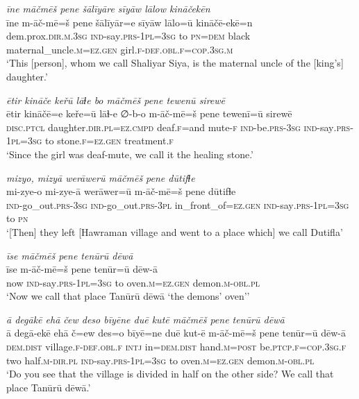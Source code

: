 \ea \label{ZP.36}
\textit{īne māčmēš pene šālīyāre sīyāw lālow kināčekēn} \\ 
\gll īne m-āč-mē=š pene šālīyār=e sīyāw lālo=ū kināčē-ekē=n \\ 
 dem.prox\textsc{.dir}\textsc{.m}\textsc{.3sg} \textsc{ind-}say\textsc{.prs}\textsc{-1pl}\textsc{=3sg} to \textsc{pn}\textsc{=dem} black maternal\_uncle\textsc{.m}\textsc{\textsc{=ez.gen}} girl\textsc{.f}\textsc{-def}\textsc{.obl}\textsc{.f}\textsc{=cop}\textsc{.3sg}\textsc{.m} \\ 
\glt `This [person], whom we call Shaliyar Siya, is the maternal uncle of the [king’s] daughter.'
\z 
 
\ea \label{ZP.51}
\textit{ētir kināče keřū lāɫe bo māčmēš pene tewenū sirewē} \\ 
\gll ētir kināčē=e keře=ū lāɫ-e ∅-b-o m-āč-mē=š pene tewenī=ū sirewē \\ 
 \textsc{disc.ptcl} daughter\textsc{.dir}\textsc{.pl}\textsc{=ez}\textsc{.cmpd} deaf\textsc{.f}=and mute\textsc{-f} \textsc{ind-}be\textsc{.prs}\textsc{-3sg} \textsc{ind-}say\textsc{.prs}\textsc{-1pl}\textsc{=3sg} to stone\textsc{.f}\textsc{\textsc{=ez.gen}} treatment\textsc{.f} \\ 
\glt `Since the girl was deaf-mute, we call it the healing stone.'
\z 
 
\ea \label{ZP.63}
\textit{mizyo, mizyā werāwerū māčmēš pene dūtifɫe} \\ 
\gll mi-zye-o mi-zye-ā werāwer=ū m-āč-mē=š pene dūtifɫe \\ 
 \textsc{ind-}go\_out\textsc{.prs}\textsc{-3sg} \textsc{ind-}go\_out\textsc{.prs}\textsc{-3pl} in\_front\_of\textsc{\textsc{=ez.gen}} \textsc{ind-}say\textsc{.prs}\textsc{-1pl}\textsc{=3sg} to \textsc{pn} \\ 
\glt `[Then] they left [Hawraman village and went to a place which] we call Dutifla'
\z 
 
\ea \label{ZP.73}
\textit{īse māčmēš pene tenūrū dēwā} \\ 
\gll īse m-āč-mē=š pene tenūr=ū dēw-ā \\ 
 now \textsc{ind-}say\textsc{.prs}\textsc{-1pl}\textsc{=3sg} to oven\textsc{.m}\textsc{\textsc{=ez.gen}} demon\textsc{.m}\textsc{-obl}\textsc{.pl} \\ 
\glt `Now we call that place Tanūrū dēwā ‘the demons’ oven’'
\z 
 
\ea \label{ZP.74}
\textit{ā degākē ehā čew deso bīyēne duē kutē māčmēš pene tenūrū dēwā} \\ 
\gll ā degā-ekē ehā č=ew des=o bīyē=ne duē kut-ē m-āč-mē=š pene tenūr=ū dēw-ā \\ 
 \textsc{dem.dist} village\textsc{.f}\textsc{-def}\textsc{.obl}\textsc{.f} \textsc{intj} in=\textsc{dem.dist} hand\textsc{.m}\textsc{=\textsc{post}} be\textsc{.ptcp}\textsc{.f}\textsc{=cop}\textsc{.3sg}\textsc{.f} two half\textsc{.m}\textsc{-dir}\textsc{.pl} \textsc{ind-}say\textsc{.prs}\textsc{-1pl}\textsc{=3sg} to oven\textsc{.m}\textsc{\textsc{=ez.gen}} demon\textsc{.m}\textsc{-obl}\textsc{.pl} \\ 
\glt `Do you see that the village is divided in half on the other side? We call that place Tanūrū dēwā.'
\z 
 

